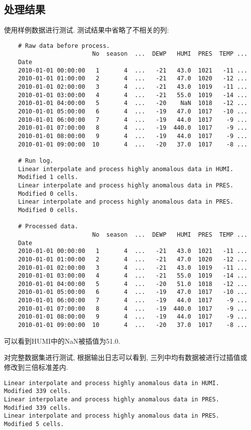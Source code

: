\subsection{处理结果}
使用样例数据进行测试. 测试结果中省略了不相关的列:
\begin{lstlisting}
    # Raw data before process.
                         No  season  ...  DEWP   HUMI  PRES  TEMP ...
    Date
    2010-01-01 00:00:00   1       4  ...   -21   43.0  1021   -11 ...
    2010-01-01 01:00:00   2       4  ...   -21   47.0  1020   -12 ...
    2010-01-01 02:00:00   3       4  ...   -21   43.0  1019   -11 ...
    2010-01-01 03:00:00   4       4  ...   -21   55.0  1019   -14 ...
    2010-01-01 04:00:00   5       4  ...   -20    NaN  1018   -12 ...
    2010-01-01 05:00:00   6       4  ...   -19   47.0  1017   -10 ...
    2010-01-01 06:00:00   7       4  ...   -19   44.0  1017    -9 ...
    2010-01-01 07:00:00   8       4  ...   -19  440.0  1017    -9 ...
    2010-01-01 08:00:00   9       4  ...   -19   44.0  1017    -9 ...
    2010-01-01 09:00:00  10       4  ...   -20   37.0  1017    -8 ...

    # Run log.
    Linear interpolate and process highly anomalous data in HUMI.
    Modified 1 cells.
    Linear interpolate and process highly anomalous data in PRES.
    Modified 0 cells.
    Linear interpolate and process highly anomalous data in PRES.
    Modified 0 cells.

    # Processed data.
                         No  season  ...  DEWP   HUMI  PRES  TEMP ...
    Date
    2010-01-01 00:00:00   1       4  ...   -21   43.0  1021   -11 ...
    2010-01-01 01:00:00   2       4  ...   -21   47.0  1020   -12 ...
    2010-01-01 02:00:00   3       4  ...   -21   43.0  1019   -11 ...
    2010-01-01 03:00:00   4       4  ...   -21   55.0  1019   -14 ...
    2010-01-01 04:00:00   5       4  ...   -20   51.0  1018   -12 ...
    2010-01-01 05:00:00   6       4  ...   -19   47.0  1017   -10 ...
    2010-01-01 06:00:00   7       4  ...   -19   44.0  1017    -9 ...
    2010-01-01 07:00:00   8       4  ...   -19  440.0  1017    -9 ...
    2010-01-01 08:00:00   9       4  ...   -19   44.0  1017    -9 ...
    2010-01-01 09:00:00  10       4  ...   -20   37.0  1017    -8 ...
\end{lstlisting}
可以看到HUMI中的NaN被插值为51.0.

对完整数据集进行测试, 根据输出日志可以看到, 三列中均有数据被进行过插值或修改到三倍标准差内.
\begin{lstlisting}
Linear interpolate and process highly anomalous data in HUMI.
Modified 339 cells.
Linear interpolate and process highly anomalous data in PRES.
Modified 339 cells.
Linear interpolate and process highly anomalous data in PRES.
Modified 5 cells.
\end{lstlisting}